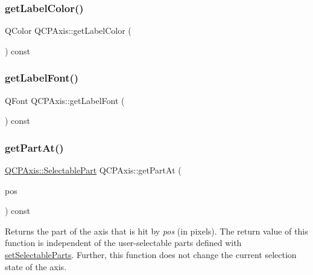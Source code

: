 \mbox{\label{class_q_c_p_axis_ae914abd56afa570cb9f2ab50e59c0f0e}} 
\subsubsection{\texorpdfstring{get\+Label\+Color()}{getLabelColor()}}
{\footnotesize\ttfamily Q\+Color Q\+C\+P\+Axis\+::get\+Label\+Color (\begin{DoxyParamCaption}{ }\end{DoxyParamCaption}) const\hspace{0.3cm}{\ttfamily [protected]}}

\mbox{\label{class_q_c_p_axis_aeac21c907d2516af9cde9a463043d671}} 
\subsubsection{\texorpdfstring{get\+Label\+Font()}{getLabelFont()}}
{\footnotesize\ttfamily Q\+Font Q\+C\+P\+Axis\+::get\+Label\+Font (\begin{DoxyParamCaption}{ }\end{DoxyParamCaption}) const\hspace{0.3cm}{\ttfamily [protected]}}

\mbox{\label{class_q_c_p_axis_a22ab2d71d7341b9b3974c0dd10619af2}} 
\subsubsection{\texorpdfstring{get\+Part\+At()}{getPartAt()}}
{\footnotesize\ttfamily \hyperlink{class_q_c_p_axis_abee4c7a54c468b1385dfce2c898b115f}{Q\+C\+P\+Axis\+::\+Selectable\+Part} Q\+C\+P\+Axis\+::get\+Part\+At (\begin{DoxyParamCaption}\item[{const Q\+PointF \&}]{pos }\end{DoxyParamCaption}) const}

Returns the part of the axis that is hit by {\itshape pos} (in pixels). The return value of this function is independent of the user-\/selectable parts defined with \hyperlink{class_q_c_p_axis_a513f9b9e326c505d9bec54880031b085}{set\+Selectable\+Parts}. Further, this function does not change the current selection state of the axis.

